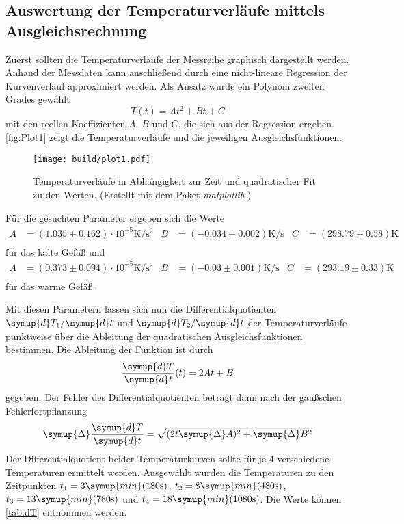 \subsection{Auswertung der Temperaturverläufe mittels Ausgleichsrechnung}
\label{subsec:Temperaturverlauf}
Zuerst sollten die Temperaturverläufe der Messreihe graphisch dargestellt werden. Anhand der Messdaten kann anschließend durch eine nicht-lineare Regression der Kurvenverlauf 
approximiert werden. Als Ansatz wurde ein Polynom zweiten Grades gewählt
\begin{equation*}
  T(t) = At^2 + Bt + C
\end{equation*}
mit den reellen Koeffizienten $A$, $B$ und $C$, die sich aus der Regression ergeben. \autoref{fig:Plot1} zeigt die Temperaturverläufe und die jeweiligen Ausgleichsfunktionen.
\begin{figure}
  \caption{Temperaturverläufe in Abhängigkeit zur Zeit und quadratischer Fit zu den Werten. (Erstellt mit dem Paket \textit{matplotlib} \cite{matplotlib})}
  \label{fig:Plot1}
  \centering
  \texttt{[image: build/plot1.pdf]}
\end{figure}

Für die gesuchten Parameter ergeben sich die Werte
\begin{align*}
  A &= (1.035 \pm 0.162)\cdot 10^{-5} \unit{\kelvin\per\second\squared} & B &= (-0.034 \pm 0.002) \unit{\kelvin\per\second} & C &= (298.79 \pm 0.58) \unit{\kelvin} \\
\end{align*}
für das kalte Gefäß und 
\begin{align*}
  A &= (0.373 \pm 0.094)\cdot 10^{-5} \unit{\kelvin\per\second\squared} & B &= (-0.03 \pm 0.001) \unit{\kelvin\per\second} & C &= (293.19 \pm 0.33) \unit{\kelvin} \\
\end{align*}
für das warme Gefäß.

Mit diesen Parametern lassen sich nun die Differentialquotienten $\symup{d}T_1/\symup{d}t$ und $\symup{d}T_2/\symup{d}t$ der Temperaturverläufe punktweise über
die Ableitung der quadratischen Ausgleichsfunktionen bestimmen.
Die Ableitung der Funktion ist durch
\begin{equation*}
  \frac{\symup{d}T}{\symup{d}t} (t) = 2 At + B
\end{equation*}
gegeben. Der Fehler des Differentialquotienten beträgt dann nach der gaußschen Fehlerfortpflanzung 
\begin{equation*}
  \symup{\Delta} \frac{\symup{d}T}{\symup{d}t} = \sqrt{(2t\symup{\Delta}A)^2 + \symup{\Delta}B^2}
\end{equation*}
Der Differentialquotient beider Temperaturkurven sollte für je 4 verschiedene Temperaturen ermittelt werden. Ausgewählt wurden die Temperaturen zu den Zeitpunkten
$t_1 = 3 \symup{min} (180 \unit{\second})$, $t_2 = 8 \symup{min} (480 \unit{\second})$, $t_3 = 13 \symup{min} (780 \unit{\second})$ und 
$t_4 = 18 \symup{min} (1080 \unit{\second})$. Die Werte können \autoref{tab:dT} entnommen werden.

